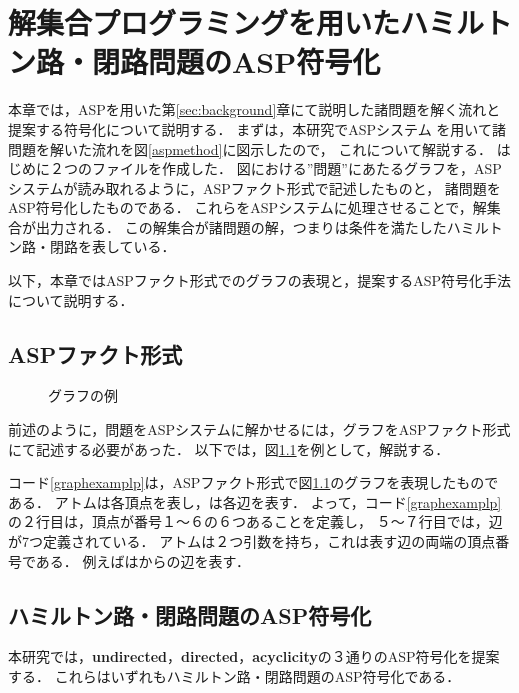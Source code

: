 \chapter{解集合プログラミングを用いたハミルトン路・閉路問題のASP符号化}
本章では，ASPを用いた第\ref{sec:background}章にて説明した諸問題を解く流れと提案する符号化について説明する．
まずは，本研究でASPシステム \clingo を用いて諸問題を解いた流れを図\ref{aspmethod}に図示したので，
これについて解説する．
はじめに２つのファイルを作成した．
図における''問題''にあたるグラフを，ASPシステムが読み取れるように，ASPファクト形式で記述したものと，
諸問題をASP符号化したものである．
これらをASPシステムに処理させることで，解集合が出力される．
この解集合が諸問題の解，つまりは条件を満たしたハミルトン路・閉路を表している．

以下，本章ではASPファクト形式でのグラフの表現と，提案するASP符号化手法について説明する．


\section{ASPファクト形式}
\begin{figure}[tbp]
\begin{center}

\caption{グラフの例}
\label{graphexample}
\end{center}
\end{figure}
前述のように，問題をASPシステムに解かせるには，グラフをASPファクト形式にて記述する必要があった．
以下では，図\ref{graphexample}を例として，解説する．

コード\ref{graphexamplp}は，ASPファクト形式で図\ref{graphexample}のグラフを表現したものである．
アトムは各頂点を表し，は各辺を表す．
よって，コード\ref{graphexamplp}の２行目は，頂点が番号１〜６の６つあることを定義し，
５〜７行目では，辺が7つ定義されている．
アトムは２つ引数を持ち，これは表す辺の両端の頂点番号である．
例えばはからの辺を表す．

\section{ハミルトン路・閉路問題のASP符号化}
本研究では，\textbf{undirected}，\textbf{directed}，\textbf{acyclicity}の３通りのASP符号化を提案する．
これらはいずれもハミルトン路・閉路問題のASP符号化である．

